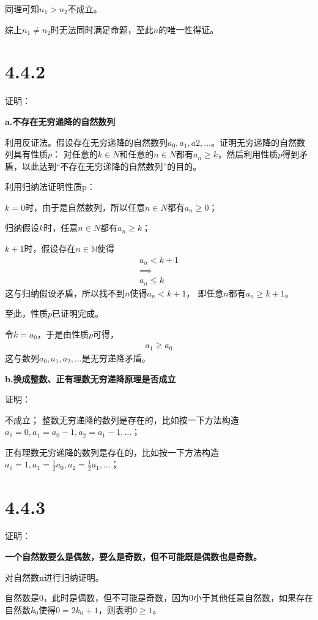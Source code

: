 \documentclass{article}
\theoremstyle{mystyle}
\begin{document}
同理可知$n_1 > n_2$不成立。

综上$n_1 \neq n_2$时无法同时满足命题，至此$n$的唯一性得证。

\section*{4.4.2}

证明：

\textbf{a.不存在无穷递降的自然数列}

利用反证法。假设存在无穷递降的自然数列$a_0,a_1,a2,...$。证明无穷递降的自然数列具有性质$p$：
对任意的$k \in N$和任意的$n \in N$都有$a_n \geq k$，然后利用性质$p$得到矛盾，以此达到“不存在无穷递降的自然数列”的目的。

利用归纳法证明性质p：

$k=0$时，由于是自然数列，所以任意$n \in N$都有$a_n \geq 0$；

归纳假设$k$时，任意$n \in N$都有$a_n \geq k$；

$k+1$时，假设存在$n \in \mathbb{N}$使得
\begin{align*}
  a_n < k + 1 \\
  \implies    \\
  a_n \leq k
\end{align*}
这与归纳假设矛盾，所以找不到$n$使得$a_n < k + 1$，
即任意$n$都有$a_n \geq k + 1$。

至此，性质$p$已证明完成。

令$k = a_0$，于是由性质$p$可得，
\begin{align*}
  a_1 \geq a_0
\end{align*}
这与数列$a_0, a_1, a_2, ...$是无穷递降矛盾。

\textbf{b.换成整数、正有理数无穷递降原理是否成立}

证明：

不成立；
整数无穷递降的数列是存在的，比如按一下方法构造$a_0=0,a_1=a_0-1,a_2=a_1-1,...$；

正有理数无穷递降的数列是存在的，比如按一下方法构造$a_0=1,a_1=\frac{1}{2}a_0,a_2=\frac{1}{2}a_1,...$；


\section*{4.4.3}

证明：

\textbf{一个自然数要么是偶数，要么是奇数，但不可能既是偶数也是奇数。}

对自然数n进行归纳证明。

自然数是$0$，此时是偶数，但不可能是奇数，因为$0$小于其他任意自然数，如果存在自然数$k_0$使得$0=2k_0+1$，则表明$0 \geq 1$。
\end{document}
